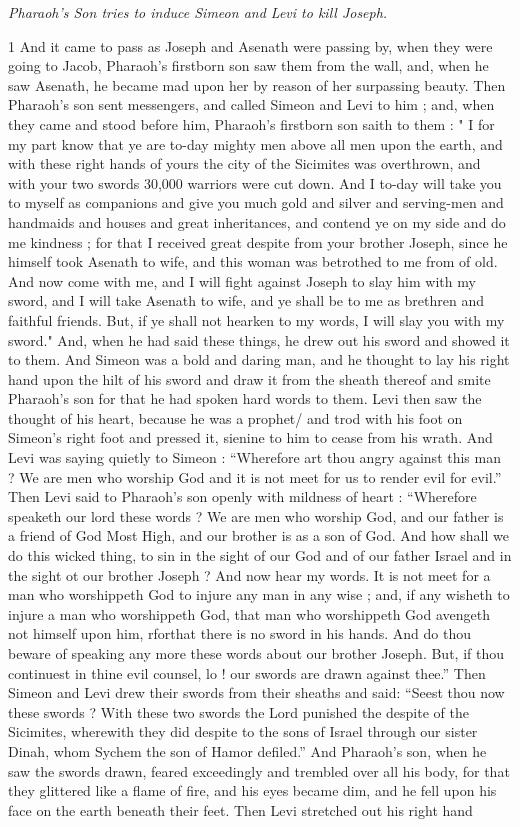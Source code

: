 \par \textit{Pharaoh's Son tries to induce Simeon and Levi to kill Joseph.}


1 And it came to pass as Joseph and Asenath were passing by, when they were going to Jacob, Pharaoh's firstborn son saw them from the wall, and, when he saw Asenath, he became mad upon her by reason of her surpassing beauty. Then Pharaoh's son sent messengers, and called Simeon and Levi to him ; and, when they came and stood before him, Pharaoh's firstborn son saith to them : " I for my part know that ye are to-day mighty men above all men upon the earth, and with these right hands of yours the city of the Sicimites was overthrown, and with your two swords 30,000 warriors were cut down. And I to-day will take you to myself as companions and give you much gold and silver and serving-men and handmaids and houses and great inheritances, and contend ye on my side and do me kindness ; for that I received great despite from your brother Joseph, since he himself took Asenath to wife, and this woman was betrothed to me from of old. And now come with me, and I will fight against Joseph to slay him with my sword, and I will take Asenath to wife, and ye shall be to me as brethren and faithful friends. But, if ye shall not hearken to my words, I will slay you with my sword." And, when he had said these things, he drew out his sword and showed it to them. And Simeon was a bold and daring man, and he thought to lay his right hand upon the hilt of his sword and draw it from the sheath thereof and smite Pharaoh's son for that he had spoken hard words to them. Levi then saw the thought of his heart, because he was a prophet/ and trod with his foot on Simeon's right foot and pressed it, sienine to him to cease from his wrath. And Levi was saying quietly to Simeon : “Wherefore art thou angry against this man ? We are men who worship God and it is not meet for us to render evil for evil.” Then Levi said to Pharaoh's son openly with mildness of heart : “Wherefore speaketh our lord these words ? We are men who worship God, and our father is a friend of God Most High, and our brother is as a son of God. And how shall we do this wicked thing, to sin in the sight of our God and of our father Israel and in the sight ot our brother Joseph ? And now hear my words. It is not meet for a man who worshippeth God to injure any man in any wise ; and, if any wisheth to injure a man who worshippeth God, that man who worshippeth God avengeth not himself upon him, rforthat there is no sword in his hands. And do thou beware of speaking any more these words about our brother Joseph. But, if thou continuest in thine evil counsel, lo ! our swords are drawn against thee.” Then Simeon and Levi drew their swords from their sheaths and said: “Seest thou now these swords ? With these two swords the Lord punished the despite of the Sicimites, wherewith they did despite to the sons of Israel through our sister Dinah, whom Sychem the son of Hamor defiled.” And Pharaoh's son, when he saw the swords drawn, feared exceedingly and trembled over all his body, for that they glittered like a flame of fire, and his eyes became dim, and he fell upon his face on the earth beneath their feet. Then Levi stretched out his right hand 